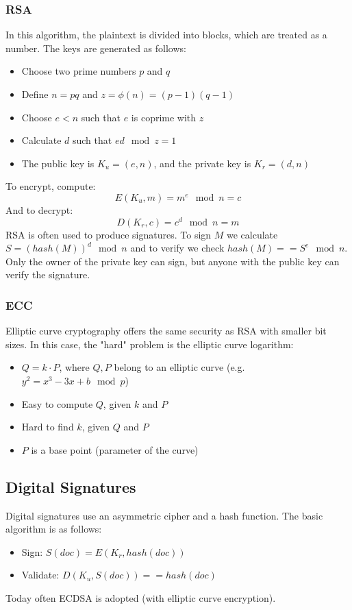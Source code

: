 \documentclass[10pt,a4paper]{report}
\begin{document}
\subsubsection{RSA}
In this algorithm, the plaintext is divided into blocks, which are treated as a number. The keys are generated as follows:
\begin{itemize}
\item Choose two prime numbers $p$ and $q$
\item Define $n = pq$ and $z = \phi(n) = (p-1)(q-1)$
\item Choose $e < n$ such that $e$ is coprime with $z$
\item Calculate $d$ such that $ed \mod z = 1$
\item The public key is $K_u = (e, n)$, and the private key is $K_r = (d, n)$
\end{itemize}
To encrypt, compute:
$$
E(K_u, m) = m^e \mod n = c
$$
And to decrypt:
$$
D(K_r, c) = c^d \mod n = m
$$
RSA is often used to produce signatures. To sign $M$ we calculate $S = (hash(M))^d \mod n$ and to verify we check $hash(M) == S^e \mod n$. Only the owner of the private key can sign, but anyone with the public key can verify the signature.
\subsubsection{ECC}
Elliptic curve cryptography offers the same security as RSA with smaller bit sizes. In this case, the "hard" problem is the elliptic curve logarithm:
\begin{itemize}
\item $Q = k \cdot P$, where $Q, P$ belong to an elliptic curve (e.g. $y^2 = x^3 - 3x + b \mod p$)
\item Easy to compute $Q$, given $k$ and $P$
\item Hard to find $k$, given $Q$ and $P$
\item $P$ is a base point (parameter of the curve)
\end{itemize}
\subsection{Digital Signatures}
Digital signatures use an asymmetric cipher and a hash function. The basic algorithm is as follows:
\begin{itemize}
\item Sign: $S(doc) = E(K_r, hash(doc))$
\item Validate: $D(K_u, S(doc)) == hash(doc)$
\end{itemize}
Today often ECDSA is adopted (with elliptic curve encryption).
\end{document}
